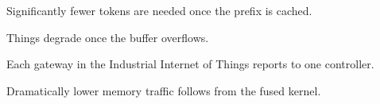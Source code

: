 
Significantly fewer tokens are needed once the prefix is cached.

Things degrade once the buffer overflows.

Each gateway in the Industrial Internet of Things reports to one controller.

Dramatically lower memory traffic follows from the fused kernel.
